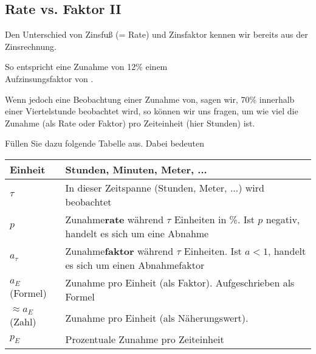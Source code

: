 \subsection{Rate vs. Faktor
  II}

Den Unterschied von Zinsfuß (= Rate) und Zinsfaktor kennen wir bereits aus der Zinsrechnung.

So entspricht eine Zunahme von 12\% einem\\
Aufzinsungsfaktor von .

Wenn jedoch eine Beobachtung einer Zunahme von, sagen wir, 70\% innerhalb einer Viertelstunde beobachtet wird, so können wir uns fragen, um wie viel die Zunahme (als Rate oder Faktor) pro Zeiteinheit (hier Stunden) ist.


Füllen Sie dazu folgende Tabelle aus. Dabei bedeuten

\begin{tabular}{lp{14cm}}\hline
  Einheit & Stunden, Minuten, Meter, ... \\\hline
  $\tau$  & In dieser Zeitspanne (Stunden, Meter, ...) wird beobachtet \\\hline
  $p$     & Zunahme\textbf{rate}\index{Zunahmerate}\index{Rate} während $\tau$ Einheiten in \%. Ist $p$ negativ, handelt es sich um eine Abnahme\\\hline
  $a_\tau$ & Zunahme\textbf{faktor}\index{Zunahmefaktor} während $\tau$ Einheiten. Ist $a<1$, handelt es sich um einen Abnahmefaktor\\\hline
  $a_E$ (Formel)   & Zunahme pro Einheit (als Faktor). Aufgeschrieben als Formel\\\hline
  $\approx a_E$ (Zahl)  & Zunahme pro Einheit (als Näherungswert).\\\hline
  $p_E$   & Prozentuale Zunahme pro Zeiteinheit\\\hline
  \end{tabular} 

\leserluft{}
\leserluft{}
\newcommand{\ph}[1]{\noTRAINER{...........}\TRAINER{#1}}

